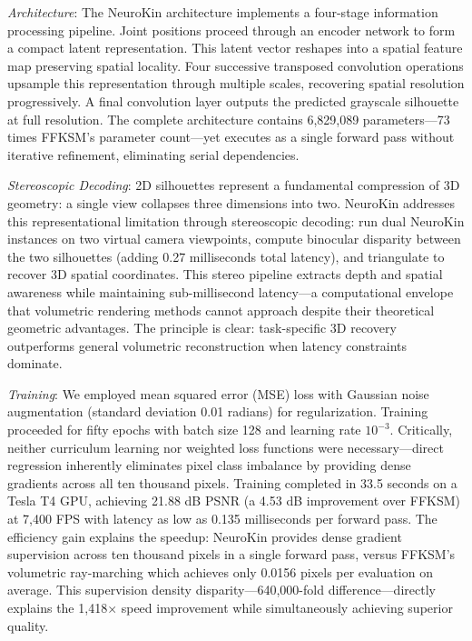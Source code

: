﻿\documentclass[11pt,a4paper]{article}
\begin{document}
\emph{Architecture}: The NeuroKin architecture implements a four-stage information processing pipeline. Joint positions proceed through an encoder network to form a compact latent representation. This latent vector reshapes into a spatial feature map preserving spatial locality. Four successive transposed convolution operations upsample this representation through multiple scales, recovering spatial resolution progressively. A final convolution layer outputs the predicted grayscale silhouette at full resolution. The complete architecture contains 6,829,089 parameters—73 times FFKSM's parameter count—yet executes as a single forward pass without iterative refinement, eliminating serial dependencies.

\emph{Stereoscopic Decoding}: 2D silhouettes represent a fundamental compression of 3D geometry: a single view collapses three dimensions into two. NeuroKin addresses this representational limitation through stereoscopic decoding: run dual NeuroKin instances on two virtual camera viewpoints, compute binocular disparity between the two silhouettes (adding 0.27 milliseconds total latency), and triangulate to recover 3D spatial coordinates. This stereo pipeline extracts depth and spatial awareness while maintaining sub-millisecond latency—a computational envelope that volumetric rendering methods cannot approach despite their theoretical geometric advantages. The principle is clear: task-specific 3D recovery outperforms general volumetric reconstruction when latency constraints dominate.

\emph{Training}: We employed mean squared error (MSE) loss with Gaussian noise augmentation (standard deviation 0.01 radians) for regularization. Training proceeded for fifty epochs with batch size 128 and learning rate $10^{-3}$. Critically, neither curriculum learning nor weighted loss functions were necessary—direct regression inherently eliminates pixel class imbalance by providing dense gradients across all ten thousand pixels. Training completed in 33.5 seconds on a Tesla T4 GPU, achieving 21.88 dB PSNR (a 4.53 dB improvement over FFKSM) at 7,400 FPS with latency as low as 0.135 milliseconds per forward pass. The efficiency gain explains the speedup: NeuroKin provides dense gradient supervision across ten thousand pixels in a single forward pass, versus FFKSM's volumetric ray-marching which achieves only 0.0156 pixels per evaluation on average. This supervision density disparity—640,000-fold difference—directly explains the 1,418× speed improvement while simultaneously achieving superior quality.
\end{document}

